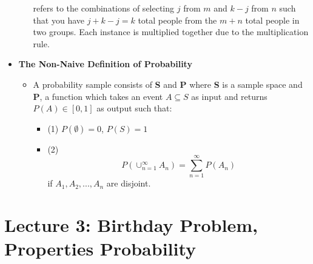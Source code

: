 \documentclass[11pt, oneside]{article}   	%
\begin{document}
\begin{itemize}
\begin{itemize}
			refers to the combinations of selecting $j$ from $m$ and $k-j$ from $n$ such that you have $j + k - j = k$ total people from the $m + n$ total people in two groups. Each instance is multiplied together due to the multiplication rule.
		\end{itemize}
		\item \textbf{The Non-Naive Definition of Probability}
			\begin{itemize}
				\item A probability sample consists of \textbf{S} and \textbf{P} where \textbf{S} is a sample space and \textbf{P}, a function which takes an event $A \subseteq S$ as input and returns $P(A) \in [0, 1]$ as output such that:
				\begin{itemize}
					\item (1) $P(\emptyset) = 0$, $P(S) = 1$
					\item (2) \[P( \cup_{n=1}^{\infty} A_{n} ) = \sum_{n=1}^{\infty} P(A_{n})\] if $A_1, A_2, ..., A_n$ are disjoint.
				\end{itemize}
			\end{itemize}
	\end{itemize}
\section{Lecture 3: Birthday Problem, Properties Probability}
\end{document}
